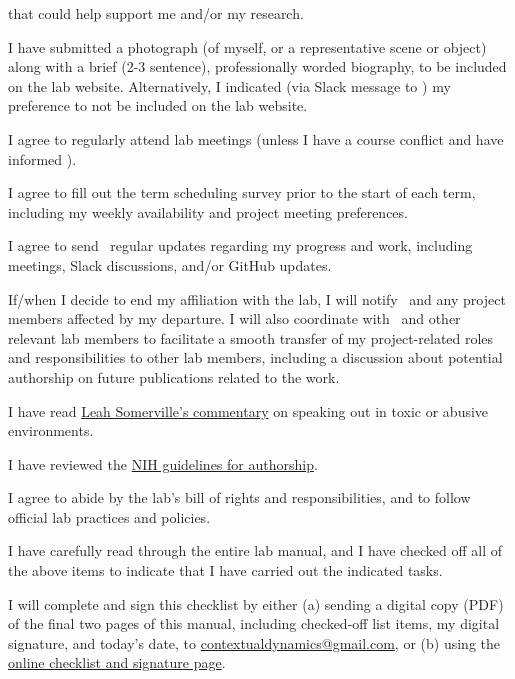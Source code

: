\documentclass{tufte-book} %
\begin{document}
\begin{todolist}
      that could help support me and/or my research.
  \item I have submitted a photograph (of myself, or a representative
    scene or object) along with a brief (2-3 sentence), professionally
    worded biography, to be included on the lab website.
    Alternatively, I indicated (via Slack message to \coordinator) my
    preference to not be included on the lab website.
  \item I agree to regularly attend lab meetings (unless I have a
    course conflict and have informed \director).
    \item I agree to fill out the term scheduling survey prior to the
    start of each term, including my weekly availability and project
    meeting preferences.
    \item I agree to send \director~regular updates regarding my
      progress and work, including meetings, Slack
      discussions, and/or GitHub updates.
      \item If/when I decide to end my affiliation with the lab, I
        will notify \director~and any project members affected by my departure.  I will also coordinate with
        \director~and other relevant lab members to facilitate a smooth
        transfer of my project-related roles and responsibilities to
        other lab members, including a discussion about potential
        authorship on future publications related to the work.
  \item I have read
    \href{https://www.sciencemag.org/careers/2018/11/what-can-we-learn-dartmouth}{Leah
      Somerville's commentary} on speaking out in toxic or abusive
    environments.
  \item I have reviewed the
    \href{https://oir.nih.gov/sites/default/files/uploads/sourcebook/documents/ethical_conduct/guidelines-authorship_contributions.pdf}{NIH
      guidelines for authorship}.
  \item I agree to abide by the lab's bill of rights and
    responsibilities, and to follow official lab practices and
    policies.
  \item I have carefully read through the entire lab manual, and I
    have checked off all of the above items to indicate that I have
    carried out the indicated tasks.
  \item I will complete and sign this checklist by either (a) sending
    a digital copy (PDF) of the final two pages of this manual,
    including checked-off list items, my digital signature, and
    today's date, to
    \href{mailto:contextualdynamics@gmail.com}{contextualdynamics@gmail.com},
    or (b) using the
    \href{https://context-lab.com/lab-manual/\#checklist-and-signature-page}{online
      checklist and signature page}.
\end{todolist}
\end{document}
